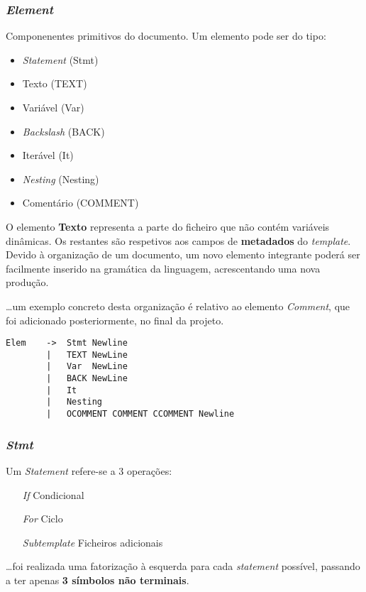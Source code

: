 \documentclass[../relatorio.tex]{subfiles}
\begin{document}
\subsubsection{\textit{Element}}\label{grm:elem}
Componenentes primitivos do documento. 
Um elemento pode ser do tipo:
\begin{itemize}
    \item \textit{Statement}    (Stmt)
    \item Texto                 (TEXT)
    \item Variável              (Var)
    \item \textit{Backslash}    (BACK)
    \item Iterável              (It)
    \item \textit{Nesting}      (Nesting)
    \item Comentário            (COMMENT)
\end{itemize}

O elemento \textbf{Texto} representa a parte do 
ficheiro que não contém variáveis dinâmicas.
Os restantes são respetivos aos campos de \textbf{metadados} do \textit{template}.
Devido à organização de um documento, um novo elemento integrante 
poderá ser facilmente inserido na gramática da linguagem, acrescentando uma nova produção.

\dots um exemplo concreto desta organização é relativo ao 
elemento \textit{Comment}, que foi adicionado 
posteriormente, no final da projeto.

\begin{verbatim}
Elem    ->  Stmt Newline
        |   TEXT NewLine
        |   Var  NewLine
        |   BACK NewLine
        |   It
        |   Nesting
        |   OCOMMENT COMMENT CCOMMENT Newline
\end{verbatim}

\subsubsection{\textit{Stmt}}\label{grm:stmt}
Um \textit{Statement} refere-se a 3 operações:
\begin{enumerate}
    \item[\textit{If}]         {Condicional}
    \item[\textit{For}]        {Ciclo}
    \item[\textit{Subtemplate}]{Ficheiros adicionais}
\end{enumerate}
\dots foi realizada uma fatorização à esquerda para cada 
\textit{statement} possível, passando a ter apenas 
\textbf{3 símbolos não terminais}.
\end{document}
